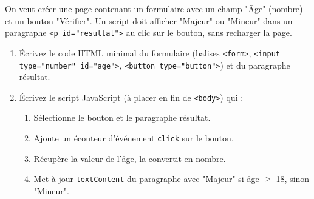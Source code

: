 \documentclass[11pt]{article}
\begin{document}
\begin{exercice}
On veut créer une page contenant un formulaire avec un champ "Âge" (nombre) et un bouton "Vérifier". Un script doit afficher "Majeur" ou "Mineur" dans un paragraphe \texttt{<p id="resultat">} au clic sur le bouton, sans recharger la page.
\begin{enumerate}
    \item Écrivez le code HTML minimal du formulaire (balises \texttt{<form>}, \texttt{<input type="number" id="age">}, \texttt{<button type="button">}) et du paragraphe résultat.
    \item Écrivez le script JavaScript (à placer en fin de \texttt{<body>}) qui :
    \begin{enumerate}
        \item Sélectionne le bouton et le paragraphe résultat.
        \item Ajoute un écouteur d'événement \texttt{click} sur le bouton.
        \item Récupère la valeur de l'âge, la convertit en nombre.
        \item Met à jour \texttt{textContent} du paragraphe avec "Majeur" si âge $\ge$ 18, sinon "Mineur".
    \end{enumerate}
\end{enumerate}
\end{exercice}
\end{document}
